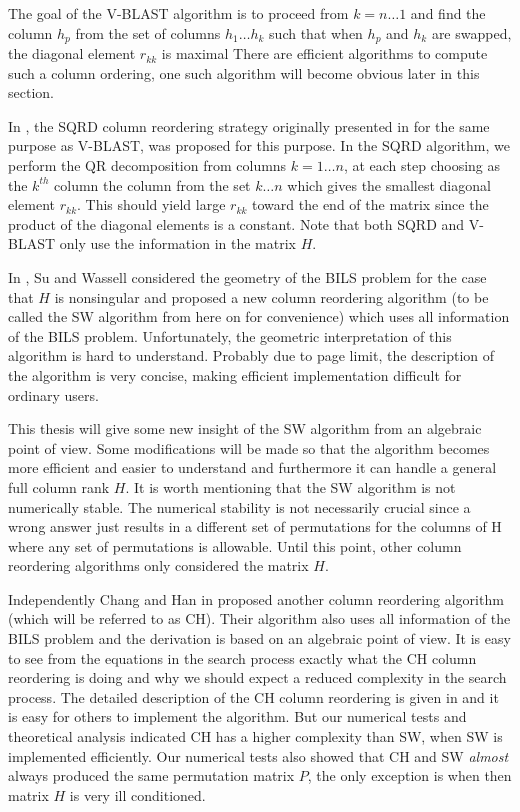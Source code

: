 \documentclass[12pt,Bold,letterpaper]{mcgilletdclass}
\begin{document}
The goal of the V-BLAST algorithm is to proceed from $k=n \dots 1$ and find the column $h_p$ from the set of columns $h_1 \dots h_k$ such that when $h_p$ and $h_k$ are swapped, the diagonal element $r_{kk}$ is maximal There are efficient algorithms to compute such a column ordering, one such algorithm will become obvious later in this section.

In \cite{ChaH05}, the SQRD column reordering strategy originally presented in \cite{WubBRKK01} for the same purpose as V-BLAST, was proposed for this purpose. In the SQRD algorithm, we perform the QR decomposition from columns $k = 1 \dots n$, at each step choosing as the $k^{th}$ column the column from the set $k \dots n$ which gives the smallest diagonal element $r_{kk}$. This should yield large $r_{kk}$ toward the end of the matrix since the product of the diagonal elements is a constant. Note that both SQRD and V-BLAST only use the information in the matrix $H$.

In \cite{SuW05}, Su and Wassell considered the geometry of the BILS
problem for the case that $H$ is nonsingular and proposed a new column reordering algorithm (to be called
the SW algorithm from here on for convenience) which uses all information of the BILS problem.
Unfortunately, the geometric interpretation of this algorithm is hard to understand.
Probably due to page limit, the description of the algorithm is very concise, 
making efficient implementation difficult for ordinary users.

This thesis will give some new insight of the SW algorithm from an algebraic point of view.
Some modifications will be made so that the algorithm becomes more efficient
and easier to understand and furthermore it can handle a general full column rank $H$.
It is worth mentioning that the SW algorithm is not numerically stable. The numerical stability is not
necessarily crucial since a wrong answer just results in a different set of
permutations for the columns of H where any set of permutations is allowable.
Until this point, other column reordering algorithms only considered the matrix $H$.

Independently  Chang and Han in \cite{ChaH05} proposed
another column reordering algorithm (which will be referred to as  CH).
Their algorithm also uses all information of the BILS problem and the derivation
is based on an algebraic point of view. It is  easy to see from the equations in
the search process exactly what the CH column reordering is doing and why we
should expect a reduced complexity in the search process. The detailed
description of the CH column reordering is given in \cite{ChaH05} and it is easy
for others to implement the algorithm.
But our numerical tests and theoretical analysis indicated CH has a higher complexity than SW, when SW
is implemented efficiently.
Our numerical tests also showed that CH and SW {\em almost} always   
produced the same permutation matrix $P$, the only exception is when then matrix $H$ is very ill conditioned.
\end{document}
